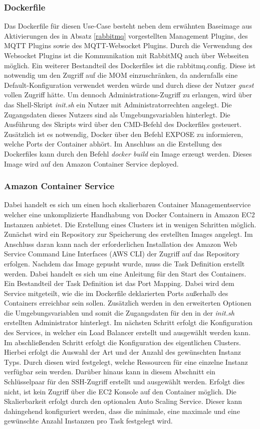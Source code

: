 \subsubsection{Dockerfile}
Das Dockerfile für diesen Use-Case besteht neben dem erwähnten Baseimage aus Aktivierungen des in Absatz \ref{rabbitmq} vorgestellten Management Plugins, des MQTT Plugins sowie des MQTT-Websocket Plugins. Durch die Verwendung des Websocket Plugins ist die Kommunikation mit RabbitMQ auch über Webseiten möglich. Ein weiterer Bestandteil des Dockerfiles ist die rabbitmq.config. Diese ist notwendig um den Zugriff auf die MOM einzuschränken, da andernfalls eine Default-Konfiguration verwendet werden würde und durch diese der Nutzer \emph{guest} vollen Zugriff hätte. Um dennoch Administrations-Zugriff zu erlangen, wird über das Shell-Skript \textit{init.sh} ein Nutzer mit Administratorrechten angelegt. Die Zugangsdaten dieses Nutzers sind als Umgebungsvariablen hinterlegt. Die Ausführung des Skripts wird über den CMD-Befehl des Dockerfiles gesteuert. Zusätzlich ist es notwendig, Docker über den Befehl EXPOSE zu informieren, welche Ports der Container abhört. Im Anschluss an die Erstellung des Dockerfiles kann durch den Befehl \emph{docker build} ein Image erzeugt werden. Dieses Image wird auf den Amazon Container Service deployed.
\subsubsection{Amazon Container Service}\label{acs}
Dabei handelt es sich um einen hoch skalierbaren Container Managementservice welcher eine unkomplizierte Handhabung von Docker Containern in Amazon EC2 Instanzen anbietet. Die Erstellung eines Clusters ist in wenigen Schritten möglich. Zunächst wird ein Repository zur Speicherung des erstellten Images angelegt. Im Anschluss daran kann nach der erforderlichen Installation des Amazon Web Service Command Line Interfaces (AWS CLI) der Zugriff auf das Repository erfolgen. Nachdem das Image gepusht wurde, muss die Task Definition erstellt werden. Dabei handelt es sich um eine Anleitung für den Start des Containers. Ein Bestandteil der Task Definition ist das Port Mapping. Dabei wird dem Service mitgeteilt, wie die im Dockerfile deklarierten Ports außerhalb des Containers erreichbar sein sollen. Zusätzlich werden in den erweiterten Optionen die Umgebungsvariablen und somit die Zugangsdaten für den in der \emph{init.sh} erstellten Administrator hinterlegt. Im nächsten Schritt erfolgt die Konfiguration des Services, in welcher ein Load Balancer erstellt und ausgewählt werden kann. Im abschließenden Schritt erfolgt die Konfiguration des eigentlichen Clusters. Hierbei erfolgt die Auswahl der Art und der Anzahl des gewünschten Instanz Typs. Durch diesen wird festgelegt, welche Ressourcen für eine einzelne Instanz verfügbar sein werden. Darüber hinaus kann in diesem Abschnitt ein Schlüsselpaar für den SSH-Zugriff erstellt und ausgewählt werden. Erfolgt dies nicht, ist kein Zugriff über die EC2 Konsole auf den Container möglich. Die Skalierbarkeit erfolgt durch den optionalen Auto Scaling Service. Dieser kann dahingehend konfiguriert werden, dass die minimale, eine maximale und eine gewünschte Anzahl Instanzen pro Task festgelegt wird.

